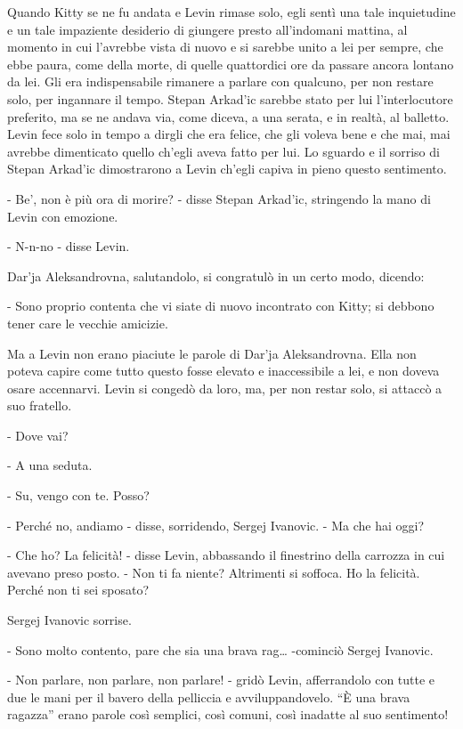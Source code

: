 Quando Kitty se ne fu andata e Levin rimase solo, egli sentì una tale inquietudine e un tale impaziente desiderio di giungere presto all'indomani mattina, al momento in cui l'avrebbe vista di nuovo e si sarebbe unito a lei per sempre, che ebbe paura, come della morte, di quelle quattordici ore da passare ancora lontano da lei. Gli era indispensabile rimanere a parlare con qualcuno, per non restare solo, per ingannare il tempo. Stepan Arkad'ic sarebbe stato per lui l'interlocutore preferito, ma se ne andava via, come diceva, a una serata, e in realtà, al balletto. Levin fece solo in tempo a dirgli che era felice, che gli voleva bene e che mai, mai avrebbe dimenticato quello ch'egli aveva fatto per lui. Lo sguardo e il sorriso di Stepan Arkad'ic dimostrarono a Levin ch'egli capiva in pieno questo sentimento. 

- Be', non è più ora di morire? - disse Stepan Arkad'ic, stringendo la mano di Levin con emozione. 

- N-n-no - disse Levin. 

Dar'ja Aleksandrovna, salutandolo, si congratulò in un certo modo, dicendo: 

- Sono proprio contenta che vi siate di nuovo incontrato con Kitty; si debbono tener care le vecchie amicizie. 

Ma a Levin non erano piaciute le parole di Dar'ja Aleksandrovna. Ella non poteva capire come tutto questo fosse elevato e inaccessibile a lei, e non doveva osare accennarvi. Levin si congedò da loro, ma, per non restar solo, si attaccò a suo fratello. 

- Dove vai? 

- A una seduta. 

- Su, vengo con te. Posso? 

- Perché no, andiamo - disse, sorridendo, Sergej Ivanovic. - Ma che hai oggi? 

- Che ho? La felicità! - disse Levin, abbassando il finestrino della carrozza in cui avevano preso posto. - Non ti fa niente? Altrimenti si soffoca. Ho la felicità. Perché non ti sei sposato? 

Sergej Ivanovic sorrise. 

- Sono molto contento, pare che sia una brava rag\ldots{} -cominciò Sergej Ivanovic. 

- Non parlare, non parlare, non parlare! - gridò Levin, afferrandolo con tutte e due le mani per il bavero della pelliccia e avviluppandovelo. ``È una brava ragazza'' erano parole così semplici, così comuni, così inadatte al suo sentimento! 

